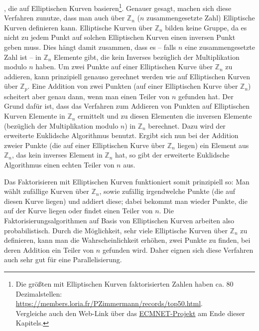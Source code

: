 \begin{refsegment}
{}, die auf Elliptischen Kurven
 basieren\footnote{%
Die größten mit Elliptischen Kurven faktorisierten
Zahlen haben ca. 80 Dezimalstellen:\\
\url{https://members.loria.fr/PZimmermann/records/top50.html}.\\
Vergleiche auch den Web-Link über das \hyperlink{Lenstra2}{ECMNET-Projekt}
 am Ende dieser Kapitels.
}.
Genauer gesagt, machen sich diese Verfahren zunutze, dass man auch
über ${\mathbb Z}_n$ ($n$ zusammengesetzte Zahl) Elliptische Kurven
definieren kann. Elliptische Kurven über ${\mathbb Z}_n$ bilden keine
Gruppe, da es nicht zu jedem Punkt auf solchen Elliptischen Kurven einen
inversen Punkt geben muss. Dies hängt damit zusammen, dass es -- falls $n$
eine zusammengesetzte Zahl ist -- in ${\mathbb Z}_n$ Elemente gibt, die
kein Inverses bezüglich der Multiplikation modulo $n$ haben. Um zwei
Punkte auf einer Elliptischen Kurve über ${\mathbb Z}_n$ zu addieren, kann
prinzipiell genauso gerechnet werden wie auf Elliptischen Kurven über
${\mathbb Z}_p$. Eine Addition von zwei Punkten (auf einer Elliptischen
Kurve über ${\mathbb Z}_n$) scheitert aber genau dann, wenn man einen
Teiler von $n$ gefunden hat. Der Grund dafür ist, dass das Verfahren zum
Addieren von Punkten auf Elliptischen Kurven Elemente in ${\mathbb Z}_n$
ermittelt und zu diesen Elementen die inversen Elemente (bezüglich der
Multiplikation modulo $n$) in ${\mathbb Z}_n$ berechnet. Dazu wird der
erweiterte  Euklidsche Algorithmus benutzt.
Ergibt sich nun bei der Addition zweier Punkte (die auf einer Elliptischen
Kurve über ${\mathbb Z}_n$ liegen) ein Element aus ${\mathbb Z}_n$, das
kein inverses Element in ${\mathbb Z}_n$ hat, so gibt der erweiterte
Euklidsche Algorithmus
einen echten Teiler von $n$ aus.

Das Faktorisieren mit Elliptischen Kurven funktioniert somit prinzipiell so: Man wählt zufällige Kurven
über ${\mathbb Z}_n$, sowie zufällig irgendwelche Punkte (die auf diesen Kurve liegen) und addiert diese; dabei
bekommt man wieder Punkte, die auf der Kurve liegen oder findet einen Teiler von $n$. Die
Faktorisierungsalgorithmen auf Basis von Elliptischen Kurven arbeiten also probabilistisch.
Durch die Möglichkeit, sehr viele Elliptische Kurven über ${\mathbb Z}_n$ zu definieren, kann man die
Wahrscheinlichkeit erhöhen, zwei Punkte zu finden, bei deren Addition ein Teiler von $n$ gefunden wird.
Daher eignen sich diese Verfahren auch sehr gut für eine Parallelisierung.



\end{refsegment}
